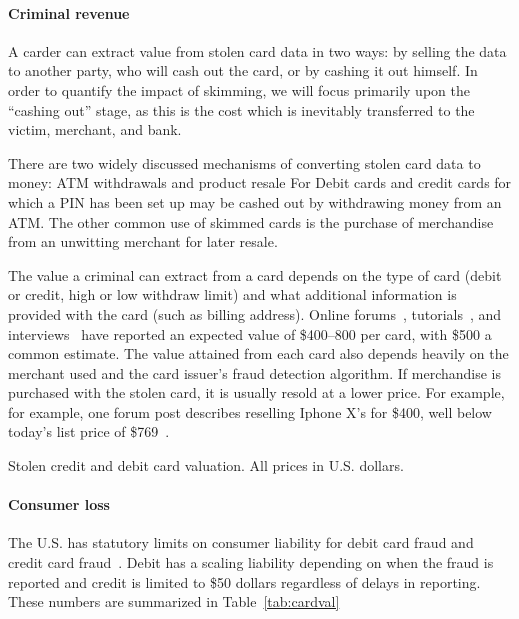 \paragraph{Criminal revenue} A carder can extract value from stolen card data in two ways: by selling the data to another
party, who will cash out the card, or by cashing it out himself. In order to quantify the impact of skimming, we will
focus primarily upon the ``cashing out'' stage, as this is the cost which is inevitably transferred to the victim,
merchant, and bank.

There are two widely discussed mechanisms of converting stolen card data to money: ATM withdrawals and product resale
\cite{krebsSkimReaper, viceInterviewWithCarder, arizonareport} For Debit cards and credit cards for which a PIN has
been set up may be cashed out by withdrawing money from an ATM. The other common use of skimmed cards is the purchase
of merchandise from an unwitting merchant for later resale.

The value a criminal can extract from a card depends on the type of card (debit or credit, high or low withdraw limit)
and what additional information is provided with the card (such as billing address). Online
forums~\cite{makingFirstMoney}, tutorials~\cite{cardingNewbieGuide, howToSucceedInStore}, and
interviews~\cite{viceInterviewWithCarder} have reported an expected value of \$400--800 per card, with
\$500 a common estimate. The value attained from each card also depends heavily on the merchant used and
the card issuer's fraud detection algorithm. If merchandise is purchased with the stolen card, it is usually resold
at a lower price. For example, for example, one forum post describes reselling Iphone X's for \$400, well below
today's list price of \$769~\cite{iphoneXSale}.

\begin{table}
    
    \caption{Stolen credit and debit card valuation. All prices in U.S. dollars.}
    \label{tab:cardval}
\end{table}

\paragraph{Consumer loss}
The U.S. has statutory limits on consumer liability for debit card fraud and credit card
fraud~\cite{15usc1643,15usc1693g}. Debit has a scaling liability depending on when the fraud is reported and
credit is limited to \$50 dollars regardless of delays in reporting. These numbers are summarized in
Table~\ref{tab:cardval}

